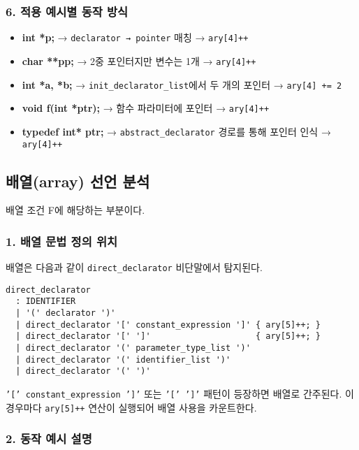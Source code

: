 \documentclass{article}
\begin{document}
\subsubsection*{6. 적용 예시별 동작 방식}

\begin{itemize}
  \item \textbf{int *p;} → \texttt{declarator → pointer} 매칭 → \texttt{ary[4]++}
  \item \textbf{char **pp;} → 2중 포인터지만 변수는 1개 → \texttt{ary[4]++}
  \item \textbf{int *a, *b;} → \texttt{init\_declarator\_list}에서 두 개의 포인터 → \texttt{ary[4] += 2}
  \item \textbf{void f(int *ptr);} → 함수 파라미터에 포인터 → \texttt{ary[4]++}
  \item \textbf{typedef int* ptr;} → \texttt{abstract\_declarator} 경로를 통해 포인터 인식 → \texttt{ary[4]++}
\end{itemize}


\subsection{배열(array) 선언 분석}

배열 조건 F에 해당하는 부분이다.

\subsubsection*{1. 배열 문법 정의 위치}

배열은 다음과 같이 \texttt{direct\_declarator} 비단말에서 탐지된다.

\begin{lstlisting}
direct_declarator
  : IDENTIFIER
  | '(' declarator ')'
  | direct_declarator '[' constant_expression ']' { ary[5]++; }
  | direct_declarator '[' ']'                     { ary[5]++; }
  | direct_declarator '(' parameter_type_list ')'
  | direct_declarator '(' identifier_list ')'
  | direct_declarator '(' ')'
\end{lstlisting}

\texttt{'[' constant\_expression ']'} 또는 \texttt{'[' ']'} 패턴이 등장하면 배열로 간주된다. 이 경우마다 \texttt{ary[5]++} 연산이 실행되어 배열 사용을 카운트한다.

\subsubsection*{2. 동작 예시 설명}
\end{document}
